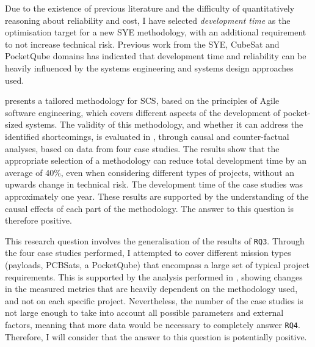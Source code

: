 \documentclass[a4paper,nobib,justified,final]{tufte-book}
\begin{document}
\begin{fullwidth}

Due to the existence of previous literature and the difficulty of quantitatively reasoning about reliability and cost, I have selected \emph{development time} as the optimisation target for a new \acs{SYE} methodology, with an additional requirement to not increase technical risk. Previous work from the \acl{SYE}, CubeSat and PocketQube domains has indicated that development time and reliability can be heavily influenced by the systems engineering and systems design approaches used.

 presents a tailored methodology for \acs{SCS}, based on the principles of Agile software engineering, which covers different aspects of the development of pocket-sized systems. The validity of this methodology, and whether it can address the identified shortcomings, is evaluated in , through causal and counter-factual analyses, based on data from four case studies. The results show that the appropriate selection of a methodology can reduce total development time by an average of 40\%, even when considering different types of projects, without an upwards change in technical risk.
The development time of the case studies was approximately one year.
These results are supported by the understanding of the causal effects of each part of the methodology. The answer to this question is therefore positive.

\pagebreak[4]
This research question involves the generalisation of the results of \texttt{RQ3}. Through the four case studies performed, I attempted to cover different mission types (payloads, \acs{PCB}Sats, a PocketQube) that encompass a large set of typical project requirements.  This is supported by the analysis performed in , showing changes in the measured metrics that are heavily dependent on the methodology used, and not on each specific project. Nevertheless, the number of the case studies is not large enough to take into account all possible parameters and external factors, meaning that more data would be necessary to completely answer \texttt{RQ4}. Therefore, I will consider that the answer to this question is potentially positive.
\end{fullwidth}
\end{document}
